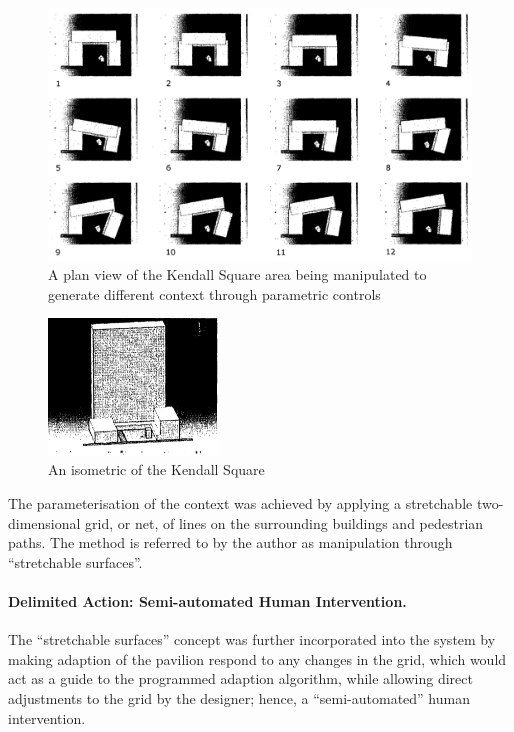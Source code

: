 \begin{figure}[htbp]
\centering
\includegraphics[width=\textwidth]{./Images/12-ParametricContext}
\caption[Parametric Context]{A plan view of the Kendall Square area being manipulated to generate different context through parametric controls \cite {zulas04}}
\label{fig:ParametricKendallSq}
\end{figure}

\begin{figure}[htbp]
\centering
\includegraphics[width=0.4\textwidth]{./Images/13-KendallIsometric}
\caption[Kendall Square Isometric]{An isometric of the Kendall Square \cite{zulas04}}
\label{fig:KendallIsom}
\end{figure}

The parameterisation of the context was achieved by applying a stretchable two-dimensional grid, or net, of lines on the surrounding buildings and pedestrian paths. The method is referred to by the author as manipulation through ``stretchable surfaces''.

\paragraph{Delimited Action: Semi-automated Human Intervention.}\mbox{}
The ``stretchable surfaces'' concept was further incorporated into the system by making adaption of the pavilion respond to any changes in the grid, which would act as a guide to the programmed adaption algorithm, while allowing direct adjustments to the grid by the designer; hence, a ``semi-automated'' human intervention.

